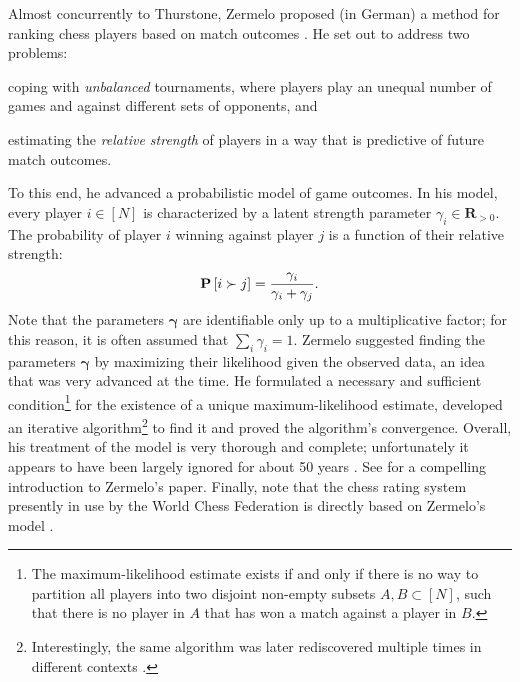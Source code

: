 Almost concurrently to Thurstone, Zermelo proposed (in German) a method for ranking chess players based on match outcomes \citep{zermelo1928berechnung}.
He set out to address two problems:
\begin{enuminline}
\item coping with \emph{unbalanced} tournaments, where players play an unequal number of games and against different sets of opponents, and
\item estimating the \emph{relative strength} of players in a way that is predictive of future match outcomes.
\end{enuminline}
To this end, he advanced a probabilistic model of game outcomes.
In his model, every player $i \in [N]$ is characterized by a latent strength parameter $\gamma_i \in \mathbf{R}_{>0}$.
The probability of player $i$ winning against player $j$ is a function of their relative strength:
\begin{align}
\label{in:eq:zermelo}
\mathbf{P}\left[ i \succ j \right] = \frac{\gamma_i}{\gamma_i + \gamma_j}.
\end{align}
Note that the parameters $\bm{\gamma}$ are identifiable only up to a multiplicative factor;
for this reason, it is often assumed that $\sum_i \gamma_i = 1$.
Zermelo suggested finding the parameters $\bm{\gamma}$ by maximizing their likelihood given the observed data, an idea that was very advanced at the time.
He formulated a necessary and sufficient condition\footnote{%
The maximum-likelihood estimate exists if and only if there is no way to partition all players into two disjoint non-empty subsets $A, B \subset [N]$, such that there is no player in $A$ that has won a match against a player in $B$.}
for the existence of a unique maximum-likelihood estimate, developed an iterative algorithm\footnote{%
Interestingly, the same algorithm was later rediscovered multiple times in different contexts \citep{bradley1952rank, ford1957solution, dykstra1960rank, hunter2004mm, caron2012efficient}.}
to find it and proved the algorithm's convergence.
Overall, his treatment of the model is very thorough and complete; unfortunately it appears to have been largely ignored for about 50 years \citep{david1988method}.
See \citet{glickman2013introductory} for a compelling introduction to Zermelo's paper.
Finally, note that the chess rating system presently in use by the World Chess Federation is directly based on Zermelo's model \citep{elo1978rating}.


